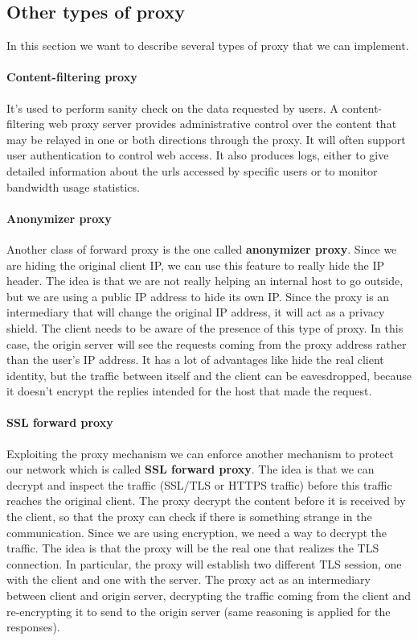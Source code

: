 \documentclass[11pt]{article}
\begin{document}
\subsection{Other types of proxy}
In this section we want to describe several types of proxy that we can implement.
\paragraph{Content-filtering proxy} It's used to perform sanity check on the data requested by users. A content-filtering web proxy server provides administrative control over the content that may be relayed in one or both directions through the proxy. It will often support user authentication to control web access. It also produces logs, either to give detailed information about the urls accessed by specific users or to monitor bandwidth usage statistics. 
\paragraph{Anonymizer proxy} Another class of forward proxy is the one called \textbf{anonymizer proxy}. Since we are hiding the original client IP, we can use this feature to really hide the IP header. The idea is that we are not really helping an internal host to go outside, but we are using a public IP address to hide its own IP. Since the proxy is an intermediary that will change the original IP address, it will act as a privacy shield. The client needs to be aware of the presence of this type of proxy. In this case, the origin server will see the requests coming from the proxy address rather than the user's IP address. It has a lot of advantages like hide the real client identity, but the traffic between itself and the client can be eavesdropped, because it doesn't encrypt the replies intended for the host that made the request.
\paragraph{SSL forward proxy} Exploiting the proxy mechanism we can enforce another mechanism to protect our network which is called \textbf{SSL forward proxy}. The idea is that we can decrypt and inspect the traffic (SSL/TLS or HTTPS traffic) before this traffic reaches the original client. The proxy decrypt the content before it is received by the client, so that the proxy can check if there is something strange in the communication. Since we are using encryption, we need a way to decrypt the traffic. The idea is that the proxy will be the real one that realizes the TLS connection. In particular, the proxy will establish two different TLS session, one with the client and one with the server. The proxy act as an intermediary between client and origin server, decrypting the traffic coming from the client and re-encrypting it to send to the origin server (same reasoning is applied for the responses). 
\end{document}
